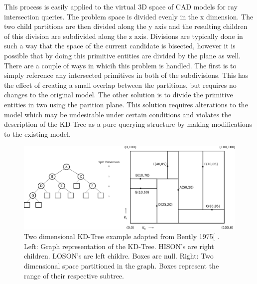 \documentclass[12pt, a4paper]{article}
\begin{document}
This process is easily applied to the virtual 3D space of CAD models for ray intersection queries. The problem space is divided evenly in the x dimension. The two child partitions are then divided along the y axis and the resulting children of this division are subdivided along the z axis. Divisions are typically done in such a way that the space of the current candidate is bisected, however it is possible that by doing this primitive entities are divided by the plane as well. There are a couple of ways in whicih this problem is handled. The first is to simply reference any intersected primitives in both of the subdivisions. This has the effect of creating a small overlap between the partitions, but requires no changes to the original model. The other solution is to divide the primitive entities in two using the parition plane.  This solution requires alterations to the model which may be undesirable under certain conditions and violates the description of the KD-Tree as a pure querying structure by making modifications to the existing model.

\begin{figure}[H]
  \caption{Two dimensional KD-Tree example adapted from Bently 1975[ \cite{Bently1975}. Left: Graph representation of the KD-Tree. HISON's are right children. LOSON's are left childre. Boxes are null. Right: Two dimensional space partitioned in the graph. Boxes represent the range of their respective subtree.}
  \label{2dkd}
  \includegraphics[scale=0.25]{2d_kd_eg.png}
\end{figure}
\end{document}
